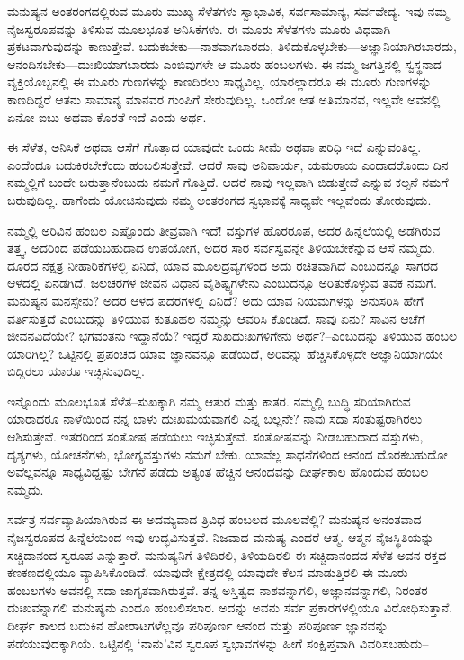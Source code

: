 ಮನುಷ್ಯನ ಅಂತರಂಗದಲ್ಲಿರುವ ಮೂರು ಮುಖ್ಯ ಸೆಳೆತಗಳು ಸ್ವಾಭಾವಿಕ, ಸರ್ವಸಾಮಾನ್ಯ, ಸರ್ವವೇದ್ಯ. ಇವು ನಮ್ಮ ನೈಜಸ್ವರೂಪವನ್ನು ತಿಳಿಸುವ ಮೂಲಭೂತ ಅನಿಸಿಕೆಗಳು. ಈ ಮೂರು ಸೆಳೆತಗಳು ಮೂರು ವಿಧವಾಗಿ ಪ್ರಕಟವಾಗುವುದನ್ನು ಕಾಣುತ್ತೇವೆ. ಬದುಕಬೇಕು—ನಾಶ\-ವಾಗ\-ಬಾರದು, ತಿಳಿದುಕೊಳ್ಳಬೇಕು—ಅಜ್ಞಾನಿ\-ಯಾಗಿರ\-ಬಾರದು, ಆನಂದಿಸ\-ಬೇಕು—ದುಃಖಿ\-ಯಾಗ\-ಬಾರದು ಎಂಬಿವುಗಳೇ ಆ ಮೂರು ಹಂಬಲಗಳು. ಈ ನಮ್ಮ ಜಗತ್ತಿನಲ್ಲಿ ಸ್ವಸ್ಥನಾದ ವ್ಯಕ್ತಿಯೊಬ್ಬ\-ನಲ್ಲಿ ಈ ಮೂರು ಗುಣಗಳನ್ನು ಕಾಣದಿರಲು ಸಾಧ್ಯವಿಲ್ಲ. ಯಾರಲ್ಲಾದರೂ ಈ ಮೂರು ಗುಣಗಳನ್ನು ಕಾಣದಿದ್ದರೆ ಆತನು ಸಾಮಾನ್ಯ ಮಾನವರ ಗುಂಪಿಗೆ ಸೇರುವುದಿಲ್ಲ. ಒಂದೋ ಆತ ಅತಿಮಾನವ, ಇಲ್ಲವೇ ಅವನಲ್ಲಿ ಏನೋ ಐಬು ಅಥವಾ ಕೊರತೆ ಇದೆ ಎಂದು ಅರ್ಥ.

ಈ ಸೆಳೆತ, ಅನಿಸಿಕೆ ಅಥವಾ ಆಸೆಗೆ ಗೊತ್ತಾದ ಯಾವುದೇ ಒಂದು ಸೀಮೆ ಅಥವಾ ಪರಿಧಿ ಇದೆ ಎನ್ನುವಂತಿಲ್ಲ. ಎಂದೆಂದೂ ಬದುಕಿರಬೇಕೆಂದು ಹಂಬಲಿಸುತ್ತೇವೆ. ಆದರೆ ಸಾವು ಅನಿವಾರ್ಯ, ಯಮರಾಯ ಎಂದಾದರೊಂದು ದಿನ ನಮ್ಮಲ್ಲಿಗೆ ಬಂದೇ ಬರುತ್ತಾನೆಂಬುದು ನಮಗೆ ಗೊತ್ತಿದೆ. ಆದರೆ ನಾವು ಇಲ್ಲವಾಗಿ ಬಿಡುತ್ತೇವೆ ಎನ್ನುವ ಕಲ್ಪನೆ ನಮಗೆ ಬರುವುದಿಲ್ಲ. ಹಾಗೆಂದು ಯೋಚಿಸುವುದು ನಮ್ಮ ಅಂತರಂಗದ ಸ್ವಭಾವಕ್ಕೆ ಸಾಧ್ಯವೇ ಇಲ್ಲವೆಂದು ತೋರುವುದು.

ನಮ್ಮಲ್ಲಿ ಅರಿವಿನ ಹಂಬಲ ಎಷ್ಟೊಂದು ತೀವ್ರವಾಗಿ ಇದೆ! ವಸ್ತುಗಳ ಹೊರರೂಪ, ಅದರ ಹಿನ್ನೆಲೆಯಲ್ಲಿ ಅಡಗಿರುವ ತತ್ತ್ವ, ಅದರಿಂದ ಪಡೆಯಬಹುದಾದ ಉಪಯೋಗ, ಅದರ ಸಾರ ಸರ್ವಸ್ವವನ್ನೇ ತಿಳಿಯಬೇಕೆನ್ನುವ ಆಸೆ ನಮ್ಮದು. ದೂರದ ನಕ್ಷತ್ರ ನೀಹಾರಿಕೆಗಳಲ್ಲಿ ಏನಿದೆ, ಯಾವ ಮೂಲದ್ರವ್ಯಗಳಿಂದ ಅದು ರಚಿತವಾಗಿದೆ ಎಂಬುದನ್ನೂ ಸಾಗರದ ಆಳದಲ್ಲಿ ಏನಡಗಿದೆ, ಜಲಚರಗಳ ಜೀವನ ವಿಧಾನ ವೈಶಿಷ್ಟ್ಯಗಳೇನು ಎಂಬುದನ್ನೂ ಅರಿತುಕೊಳ್ಳುವ ತವಕ ನಮಗೆ. ಮನುಷ್ಯನ ಮನಸ್ಸೇನು? ಅದರ ಆಳದ ಪದರಗಳಲ್ಲಿ ಏನಿದೆ? ಅದು ಯಾವ ನಿಯಮಗಳನ್ನು ಅನುಸರಿಸಿ ಹೇಗೆ ವರ್ತಿಸುತ್ತದೆ ಎಂಬುದನ್ನು ತಿಳಿಯುವ ಕುತೂಹಲ ನಮ್ಮನ್ನು ಆವರಿಸಿ ಕೊಂಡಿದೆ. ಸಾವು ಏನು? ಸಾವಿನ ಆಚೆಗೆ ಜೀವನವಿದೆಯೇ? ಭಗವಂತನು ಇದ್ದಾನೆಯೆ? ಇದ್ದರೆ ಸುಖದುಃಖಗಳಿಗೇನು ಅರ್ಥ?–ಎಂಬುದನ್ನು ತಿಳಿಯುವ ಹಂಬಲ ಯಾರಿಗಿಲ್ಲ? ಒಟ್ಟಿನಲ್ಲಿ ಪ್ರಪಂಚದ ಯಾವ ಜ್ಞಾನವನ್ನೂ ಪಡೆಯದೆ, ಅರಿವನ್ನು ಹೆಚ್ಚಿಸಿಕೊಳ್ಳದೇ ಅಜ್ಞಾನಿಯಾಗಿಯೇ ಬಿದ್ದಿರಲು ಯಾರೂ ಇಚ್ಛಿಸುವುದಿಲ್ಲ.

ಇನ್ನೊಂದು ಮೂಲಭೂತ ಸೆಳೆತ–ಸುಖಕ್ಕಾಗಿ ನಮ್ಮ ಆತುರ ಮತ್ತು ಕಾತರ. ನಮ್ಮಲ್ಲಿ ಬುದ್ಧಿ ಸರಿಯಾಗಿರುವ ಯಾರಾದರೂ ನಾಳೆಯಿಂದ ನನ್ನ ಬಾಳು ದುಃಖಮಯವಾಗಲಿ ಎನ್ನ ಬಲ್ಲನೇ? ನಾವು ಸದಾ ಸಂತುಷ್ಟರಾಗಿರಲು ಆಶಿಸುತ್ತೇವೆ. ಇತರರಿಂದ ಸಂತೋಷ ಪಡೆಯಲು ಇಚ್ಛಿಸುತ್ತೇವೆ. ಸಂತೋಷವನ್ನು ನೀಡಬಹುದಾದ ವಸ್ತುಗಳು, ದೃಶ್ಯಗಳು, ಯೋಚನೆಗಳು, ಭೋಗ್ಯವಸ್ತುಗಳು ನಮಗೆ ಬೇಕು. ಯಾವೆಲ್ಲ ಸಾಧನೆಗಳಿಂದ ಆನಂದ ದೊರಕಬಹುದೋ ಅವೆಲ್ಲವನ್ನೂ ಸಾಧ್ಯವಿದ್ದಷ್ಟು ಬೇಗನೆ ಪಡೆದು ಅತ್ಯಂತ ಹೆಚ್ಚಿನ ಆನಂದವನ್ನು ದೀರ್ಘಕಾಲ ಹೊಂದುವ ಹಂಬಲ ನಮ್ಮದು.

ಸರ್ವತ್ರ ಸರ್ವವ್ಯಾಪಿಯಾಗಿರುವ ಈ ಅದಮ್ಯವಾದ ತ್ರಿವಿಧ ಹಂಬಲದ ಮೂಲವೆಲ್ಲಿ? ಮನುಷ್ಯನ ಅನಂತವಾದ ನೈಜಸ್ವರೂಪದ ಹಿನ್ನೆಲೆಯಿಂದ ಇವು ಉದ್ಭವಿಸುತ್ತವೆ. ನಿಜವಾದ ಮನುಷ್ಯ ಎಂದರೆ ಆತ್ಮ. ಆತ್ಮನ ನೈಜಸ್ಥಿತಿಯನ್ನು ಸಚ್ಚಿದಾನಂದ ಸ್ವರೂಪ ಎನ್ನುತ್ತಾರೆ. ಮನುಷ್ಯನಿಗೆ ತಿಳಿದಿರಲಿ, ತಿಳಿಯದಿರಲಿ ಈ ಸಚ್ಚಿದಾನಂದದ ಸೆಳೆತ ಅವನ ರಕ್ತದ ಕಣಕಣದಲ್ಲಿಯೂ ವ್ಯಾಪಿಸಿಕೊಂಡಿದೆ. ಯಾವುದೇ ಕ್ಷೇತ್ರದಲ್ಲಿ ಯಾವುದೇ ಕೆಲಸ ಮಾಡುತ್ತಿರಲಿ ಈ ಮೂರು ಹಂಬಲಗಳು ಅವನಲ್ಲಿ ಸದಾ ಜಾಗೃತವಾಗಿರುತ್ತವೆ. ತನ್ನ ಅಸ್ತಿತ್ವದ ನಾಶವನ್ನಾಗಲಿ, ಅಜ್ಞಾನವನ್ನಾಗಲಿ, ನಿರಂತರ ದುಃಖವನ್ನಾಗಲಿ ಮನುಷ್ಯನು ಎಂದೂ ಹಂಬಲಿಸಲಾರ. ಅದನ್ನು ಅವನು ಸರ್ವ ಪ್ರಕಾರಗಳಲ್ಲಿಯೂ ವಿರೋಧಿಸುತ್ತಾನೆ. ದೀರ್ಘ ಕಾಲದ ಬದುಕಿನ ಹೋರಾಟಗಳೆಲ್ಲವೂ ಪರಿ\-ಪೂರ್ಣ ಆನಂದ ಮತ್ತು ಪರಿಪೂರ್ಣ ಜ್ಞಾನವನ್ನು ಪಡೆಯುವುದಕ್ಕಾಗಿಯೆ. ಒಟ್ಟಿನಲ್ಲಿ ‘ನಾನು’ವಿನ ಸ್ವರೂಪ ಸ್ವಭಾವಗಳನ್ನು ಹೀಗೆ ಸಂಕ್ಷಿಪ್ತವಾಗಿ ವಿವರಿಸಬಹುದು–

